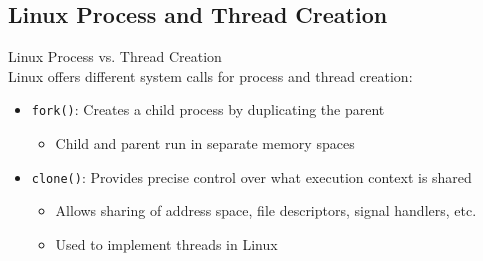 \subsection{Linux Process and Thread Creation}

\begin{theorem}{Linux Process vs. Thread Creation}\\
    Linux offers different system calls for process and thread creation:
    \begin{itemize}
        \item \texttt{fork()}: Creates a child process by duplicating the parent
            \begin{itemize}
                \item Child and parent run in separate memory spaces
            \end{itemize}
        \item \texttt{clone()}: Provides precise control over what execution context is shared
            \begin{itemize}
                \item Allows sharing of address space, file descriptors, signal handlers, etc.
                \item Used to implement threads in Linux
            \end{itemize}
    \end{itemize}
\end{theorem}

